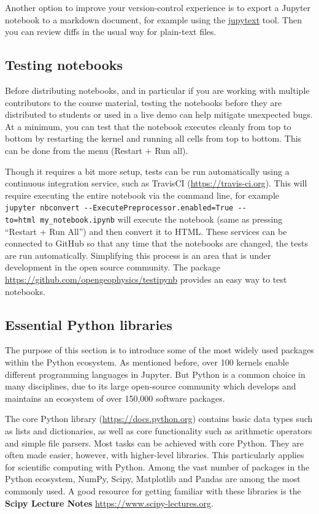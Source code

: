 \documentclass[]{book}
\begin{document}
Another option to improve your version-control experience is to export a
Jupyter notebook to a markdown document, for example using the
\href{https://github.com/mwouts/jupytext}{jupytext} tool. Then you can
review diffs in the usual way for plain-text files.

\subsection{Testing notebooks}\label{testing-notebooks}

Before distributing notebooks, and in particular if you are working with
multiple contributors to the course material, testing the notebooks
before they are distributed to students or used in a live demo can help
mitigate unexpected bugs. At a minimum, you can test that the notebook
executes cleanly from top to bottom by restarting the kernel and running
all cells from top to bottom. This can be done from the menu (Restart +
Run all).

Though it requires a bit more setup, tests can be run automatically
using a continuous integration service, such as TravisCI
(\url{https://travis-ci.org}). This will require executing the entire
notebook via the command line, for example
\texttt{jupyter\ nbconvert\ -\/-ExecutePreprocessor.enabled=True\ -\/-to=html\ my\_notebook.ipynb}
will execute the notebook (same as pressing ``Restart + Run All'') and
then convert it to HTML. These services can be connected to GitHub so
that any time that the notebooks are changed, the tests are run
automatically. Simplifying this process is an area that is under
development in the open source community. The package
\url{https://github.com/opengeophysics/testipynb} provides an easy way
to test notebooks.

\subsection{Essential Python
libraries}\label{essential-python-libraries}

The purpose of this section is to introduce some of the most widely used
packages within the Python ecosystem. As mentioned before, over 100
kernels enable different programming languages in Jupyter. But Python is
a common choice in many disciplines, due to its large open-source
community which develops and maintains an ecosystem of over 150,000
software packages.

The core Python library
(\href{https://docs.python.org/3/}{https://docs.python.org}) contains
basic data types such as lists and dictionaries, as well as core
functionality such as arithmetic operators and simple file parsers. Most
tasks can be achieved with core Python. They are often made easier,
however, with higher-level libraries. This particularly applies for
scientific computing with Python. Among the vast number of packages in
the Python ecosystem, NumPy, Scipy, Matplotlib and Pandas are among the
most commonly used. A good resource for getting familiar with these
libraries is the \textbf{Scipy Lecture Notes}
\url{https://www.scipy-lectures.org}.
\end{document}

